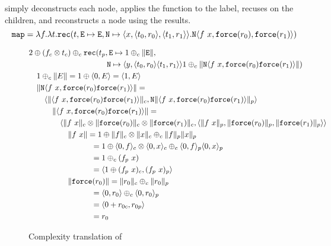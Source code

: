%
 simply deconstructs each node, applies the function to the label,
recuses on the children, and reconstructs a node using the results.
%
\begin{equation*}
  \texttt{map} = \lambda f.\lambda t.\texttt{rec}(t, \texttt{E} \mapsto \texttt{E}, \texttt{N} \mapsto \langle x, \langle t_0, r_0 \rangle, \langle t_1, r_1 \rangle\rangle.\texttt{N} \langle f\ x, \texttt{force}(r_0), \texttt{force}(r_1)\rangle)
\end{equation*}
%
\begin{figure}
  \label{fig:ws_treemap_complexity_translation}
  \caption{Complexity translation of }
  \begin{equation*}
    \begin{split}
      &2 \oplus (f_c \otimes t_c) \oplus_c \T{rec}(t_p, \T{E} \mapsto 1 \oplus_c \|\T{E}\|, \\
      &\quadten \T{N} \mapsto \LP y, \LP t_0, r_0 \RP \LP t_1, r_1 \RP \RP 1 \oplus_c \|\T{N}\LP f\ x, \T{force}(r_0) \T{force}(r_1)\RP \| ) \\
      &\quad 1 \oplus_c \|E\| = 1 \oplus \LP 0, E \RP = \LP 1, E \RP \\
      &\quad \|\T{N}\LP f\ x, \T{force}(r_0) \T{force}(r_1)\RP \| = \\
      &\qquad \LP \|\LP f\ x, \T{force}(r_0) \T{force}(r_1)\RP \|_c, \T{N} \|\LP f\ x, \T{force}(r_0) \T{force}(r_1)\RP\|_p\RP \\
      &\quadthree \|\LP f\ x, \T{force}(r_0) \T{force}(r_1)\RP \| = \\
      &\quadfour \LP \|f\ x\|_c \otimes \|\T{force}(r_0)\|_c \otimes \|\T{force}(r_1)\|_c, \LP \|f\ x\|_p, \|\T{force}(r_0)\|_p, \|\T{force}(r_1)\|_p \RP \RP \\
      &\quadfive  \|f\ x\| = 1 \oplus \|f\|_c \otimes \|x\|_c \oplus_c \|f\|_p \|x\|_p \\
      &\quadeight = 1 \oplus \LP 0, f \RP_c \otimes \LP 0, x \RP_c \oplus_c \LP 0, f \RP_p \LP 0, x \RP_p \\
      &\quadeight = 1 \oplus_c (f_p\ x) \\
      &\quadeight = \LP 1 \oplus (f_p\ x)_c, (f_p\ x)_p \RP \\
      &\quadfive \|\T{force}(r_0)\| = \|r_0\|_c \oplus_c \|r_0\|_p \\
      &\quadeight = \LP 0, r_0 \RP \oplus_c \LP 0, r_0 \RP_p \\
      &\quadeight = \LP 0 + r_{0c}, r_{0p} \RP \\
      &\quadeight = r_0 \\

\end{split}
\end{equation*}
\end{figure}
